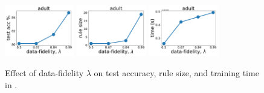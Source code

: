 \begin{figure}
	\subfloat
	{\includegraphics[width=0.27\textwidth]{figures/interpretability/relaxed-cnf/adult_test_accuracy_vary_lambda.pdf}}
	\subfloat
	{\includegraphics[width=0.27\textwidth]{figures/interpretability/relaxed-cnf/adult_rule_size_vary_lambda.pdf}}
	\subfloat
	{\includegraphics[width=0.27\textwidth]{figures/interpretability/relaxed-cnf/adult_time_vary_lambda.pdf}} 
	\\
	

	\caption[Effect of data-fidelity $ \lambda $ in {\crr}]{Effect of data-fidelity $ \lambda $ on test accuracy, rule size, and training time in {\crr}. } 
	\label{interpretability_crr_fig:result_lambda}
\end{figure}


